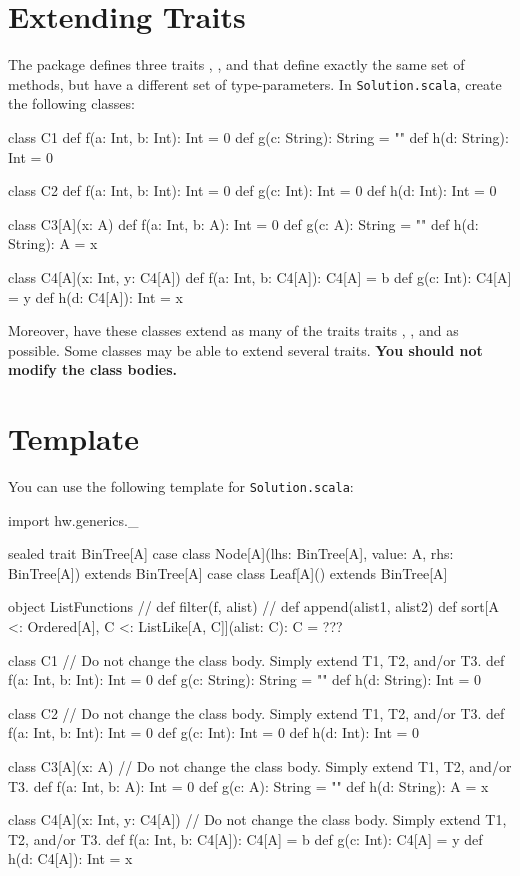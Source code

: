 \documentclass{book}
\begin{document}
\section{Extending Traits}

The package  defines three traits ,
, and 
that define exactly the same
set of methods, but have a different set of type-parameters.
In \texttt{Solution.scala}, create the following classes:

\begin{scalacode}
class C1 {
  def f(a: Int, b: Int): Int = 0
  def g(c: String): String = ""
  def h(d: String): Int = 0
}


class C2 {
  def f(a: Int, b: Int): Int = 0
  def g(c: Int):  Int = 0
  def h(d: Int): Int = 0
}

class C3[A](x: A) {
  def f(a: Int, b: A): Int = 0
  def g(c: A): String = ""
  def h(d: String): A = x
}

class C4[A](x: Int, y: C4[A]) {
  def f(a: Int, b: C4[A]): C4[A] = b
  def g(c: Int): C4[A] = y
  def h(d: C4[A]): Int = x
}
\end{scalacode}

Moreover, have these classes extend as many of the traits
traits , , and 
as possible. Some classes may be able to extend several
traits. \textbf{You should not modify the class bodies.}



\section{Template}

You can use the following template for \texttt{Solution.scala}:
\begin{scalacode}
import hw.generics._

sealed trait BinTree[A]
case class Node[A](lhs: BinTree[A], value: A, rhs: BinTree[A]) extends BinTree[A]
case class Leaf[A]() extends BinTree[A]

object ListFunctions {
  // def filter(f, alist)
  // def append(alist1, alist2)
  def sort[A <: Ordered[A], C <: ListLike[A, C]](alist: C): C = ???
}

class C1 {
  // Do not change the class body. Simply extend T1, T2, and/or T3.
  def f(a: Int, b: Int): Int = 0
  def g(c: String): String = ""
  def h(d: String): Int = 0
}

class C2 {
  // Do not change the class body. Simply extend T1, T2, and/or T3.
  def f(a: Int, b: Int): Int = 0
  def g(c: Int):  Int = 0
  def h(d: Int): Int = 0
}


class C3[A](x: A) {
  // Do not change the class body. Simply extend T1, T2, and/or T3.
  def f(a: Int, b: A): Int = 0
  def g(c: A): String = ""
  def h(d: String): A = x
}

class C4[A](x: Int, y: C4[A]) {
  // Do not change the class body. Simply extend T1, T2, and/or T3.
  def f(a: Int, b: C4[A]): C4[A] = b
  def g(c: Int): C4[A] = y
  def h(d: C4[A]): Int = x
}
\end{scalacode}
\end{document}
